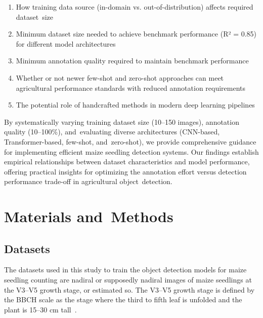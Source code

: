 \documentclass[12pt,a4paper,oneside]{report}
\begin{document}
\begin{enumerate}
    \item How training data source (in-domain vs. out-of-distribution) affects required dataset~size
    \item Minimum dataset size needed to achieve benchmark performance (R² = 0.85) for different model architectures
    \item Minimum annotation quality required to maintain benchmark performance
    \item Whether or not newer few-shot and zero-shot approaches can meet agricultural performance standards with reduced annotation requirements
    \item The potential role of handcrafted methods in modern deep learning pipelines
\end{enumerate}

By systematically varying training dataset size (10--150 images), annotation quality
(10--100\%), and~evaluating diverse architectures (CNN-based, Transformer-based,
few-shot, and~zero-shot), we provide comprehensive guidance for implementing efficient
maize seedling detection systems. Our findings establish empirical relationships
between dataset characteristics and model performance, offering practical insights
for optimizing the annotation effort versus detection performance trade-off in
agricultural object~detection.

\section{Materials and~Methods}
\unskip

\subsection{Datasets}
The datasets used in this study to train the object detection models for maize seedling
counting are nadiral or supposedly nadiral images of maize seedlings at the V3--V5 growth stage,
or estimated so.
The V3--V5 growth stage is defined by the BBCH scale as the stage where the third to fifth
leaf is unfolded and the plant is 15--30 cm tall~\cite{meierBBCHSystemCoding2009}.
\end{document}
